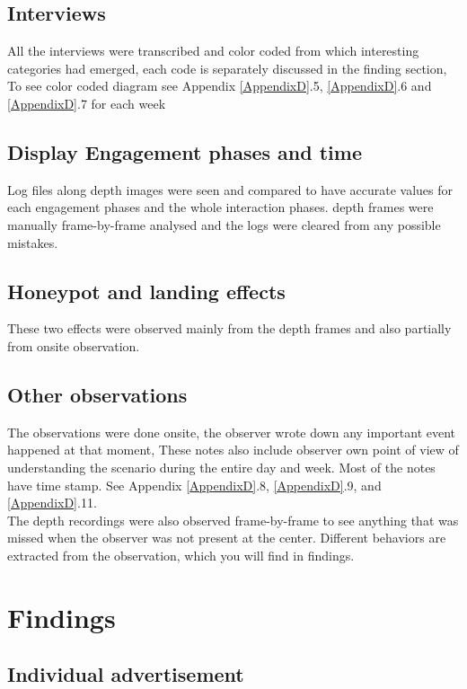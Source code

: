 \subsection {Interviews} 
All the interviews were transcribed and color coded from which interesting categories had emerged, each code is separately discussed in the finding section, To see color coded diagram see Appendix \ref{AppendixD}.5, \ref{AppendixD}.6 and \ref{AppendixD}.7 for each week


\subsection {Display Engagement phases and time} 
Log files along depth images were seen and compared to have accurate values for each engagement phases and the whole interaction phases. depth frames were manually frame-by-frame analysed and the logs were cleared from any possible mistakes.

\subsection {Honeypot and landing effects}
These two effects were observed mainly from the depth frames and also partially from onsite observation.

\subsection {Other observations}
The observations were done onsite, the observer wrote down any important event happened at that moment, These notes also include observer own point of view of understanding the scenario during the entire day and week. Most of the notes have time stamp. See Appendix \ref{AppendixD}.8, \ref{AppendixD}.9, and \ref{AppendixD}.11.\\
The depth recordings were also observed frame-by-frame to see anything that was missed when the observer was not present at the center. Different behaviors are extracted from the observation, which you will find in findings.



\newpage
\section{Findings}



\subsection{Individual advertisement}



